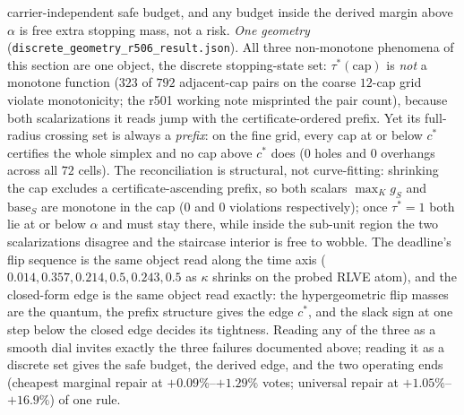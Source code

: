 \documentclass{article}
\theoremstyle{definition}
\theoremstyle{remark}
\begin{document}
carrier-independent safe budget, and any budget inside the derived
margin above $\alpha$ is free extra stopping mass, not a risk.
\emph{One geometry} (\texttt{discrete\_geometry\_r506\_result.json}).
All three non-monotone phenomena of this section are one object, the
discrete stopping-state set: $\tau^*(\text{cap})$ is \emph{not} a
monotone function ($323$ of $792$ adjacent-cap pairs on the coarse
$12$-cap grid violate monotonicity; the r501 working note misprinted
the pair count), because both scalarizations it reads jump with the
certificate-ordered prefix. Yet its full-radius crossing set is
always a \emph{prefix}: on the fine grid, every cap at or below $c^*$
certifies the whole simplex and no cap above $c^*$ does ($0$ holes
and $0$ overhangs across all $72$ cells). The reconciliation is
structural, not curve-fitting: shrinking the cap excludes a
certificate-ascending prefix, so both scalars $\max_K g_S$ and
$\mathrm{base}_S$ are monotone in the cap ($0$ and $0$ violations
respectively); once $\tau^*{=}1$ both lie at or below $\alpha$ and
must stay there, while inside the sub-unit region the two
scalarizations disagree and the staircase interior is free to wobble.
The deadline's flip sequence is the same object read along the time
axis ($0.014, 0.357, 0.214, 0.5, 0.243, 0.5$ as $\kappa$ shrinks on
the probed RLVE atom), and the closed-form edge is the same object
read exactly: the hypergeometric flip masses are the quantum, the
prefix structure gives the edge $c^*$, and the slack sign at one step
below the closed edge decides its tightness. Reading any of the three
as a smooth dial invites exactly the three failures documented above;
reading it as a discrete set gives the safe budget, the derived edge,
and the two operating ends (cheapest marginal repair at
${+}0.09\%$--${+}1.29\%$ votes; universal repair at
${+}1.05\%$--${+}16.9\%$) of one rule.
\end{document}
